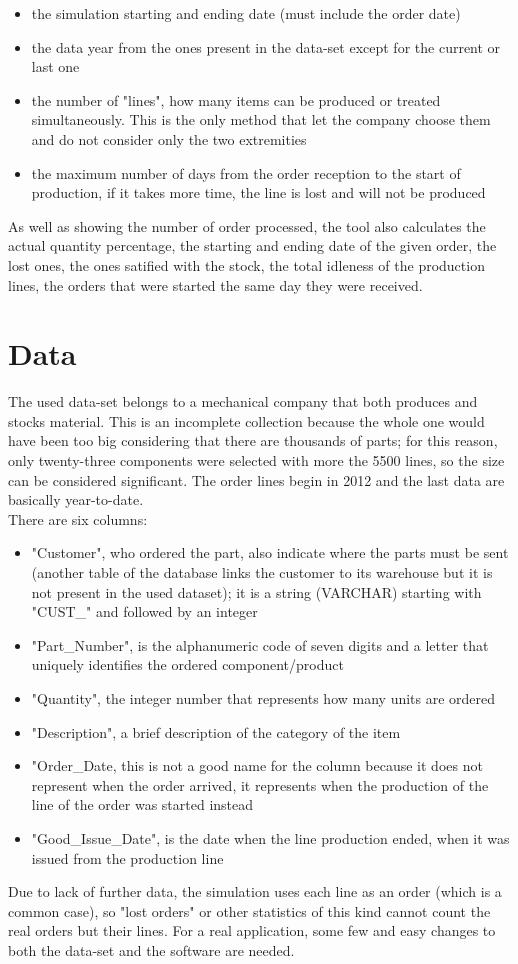 \documentclass[a4paper,12pt]{article}
\begin{document}
\begin{itemize}
	\item the simulation starting and ending date (must include the order date)
	\item the data year from the ones present in the data-set except for the current or last one
	\item the number of "lines", how many items can be produced or treated simultaneously. This is the only method that let the company choose them and do not consider only the two extremities
	\item the maximum number of days from the order reception to the start of production, if it takes more time, the line is lost and will not be produced
\end{itemize}
As well as showing the number of order processed, the tool also calculates the actual quantity percentage, the starting and ending date of the given order, the lost ones, the ones satified with the stock, the total idleness of the production lines, the orders that were started the same day they were received.

\newpage
\section{Data}
The used data-set belongs to a mechanical company that both produces and stocks material. This is an incomplete collection because the whole one would have been too big considering that there are thousands of parts; for this reason, only twenty-three components were selected with more the 5500 lines, so the size can be considered significant. The order lines begin in 2012  and the last data are basically year-to-date. \\
There are six columns:
\begin{itemize}
	 \item "Customer", who ordered the part, also indicate where the parts must be sent (another table of the database links the customer to its warehouse but it is not present in the used dataset); it is a string (VARCHAR) starting with "CUST\_" and followed by an integer
	 \item "Part\_Number", is the alphanumeric code of seven digits and a letter that uniquely identifies the ordered component/product
	\item "Quantity", the integer number that represents how many units are ordered
	\item "Description", a brief description of the category of the item
	\item "Order\_Date, this is not a good name for the column because it does not represent when the order arrived, it represents when the production of the line of the order was started instead
	\item "Good\_Issue\_Date", is the date when the line production ended, when it was issued from the production line
\end{itemize}
Due to lack of further data, the simulation uses each line as an order (which is a common case), so "lost orders" or other statistics of this kind cannot count the real orders but their lines. For a real application, some few and easy changes to both the data-set and the software are needed.
\end{document}

